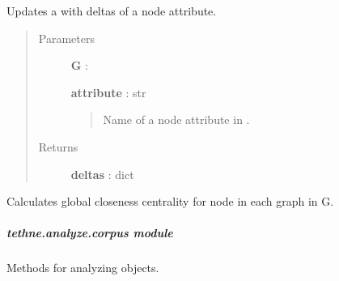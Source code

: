\documentclass[letterpaper,10pt,english]{sphinxmanual}
\begin{document}
\begin{fulllineitems}
\label{tethne.analyze.collection:tethne.analyze.collection.delta}
Updates a {\hyperref[tethne.classes.graphcollection:tethne.classes.graphcollection.GraphCollection]{}} with deltas of a node attribute.
\begin{quote}\begin{description}
\item[{Parameters}] \leavevmode
\textbf{G} : {\hyperref[tethne.classes.graphcollection:tethne.classes.graphcollection.GraphCollection]{}}

\textbf{attribute} : str
\begin{quote}

Name of a node attribute in .
\end{quote}

\item[{Returns}] \leavevmode
\textbf{deltas} : dict

\end{description}\end{quote}

\end{fulllineitems}


\begin{fulllineitems}
\label{tethne.analyze.collection:tethne.analyze.collection.node_global_closeness_centrality}
Calculates global closeness centrality for node in each graph in
{\hyperref[tethne.classes.graphcollection:tethne.classes.graphcollection.GraphCollection]{}} G.

\end{fulllineitems}



\subparagraph{tethne.analyze.corpus module}
\label{tethne.analyze.corpus:module-tethne.analyze.corpus}\label{tethne.analyze.corpus::doc}\label{tethne.analyze.corpus:tethne-analyze-corpus-module}
Methods for analyzing {\hyperref[tethne.classes.corpus:tethne.classes.corpus.Corpus]{}} objects.
\end{document}
